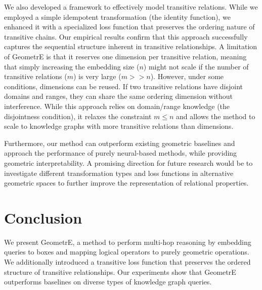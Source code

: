 \documentclass[runningheads]{llncs}
\newcommand{\method}{GeometrE}
\begin{document}
We also developed a framework to effectively model transitive
relations. While we employed a simple idempotent transformation (the
identity function), we enhanced it with a specialized loss function
that preserves the ordering nature of transitive chains. Our empirical
results confirm that this approach successfully captures the
sequential structure inherent in transitive relationships. A
limitation of GeometrE is that it reserves one dimension per
transitive relation, meaning that simply increasing the embedding size
($n$) might not scale if the number of transitive relations ($m$) is
very large ($m >> n$).  However, under some conditions, dimensions can
be reused. If two transitive relations have disjoint domains and
ranges, they can share the same ordering dimension without
interference. While this approach relies on domain/range knowledge
(the disjointness condition), it relaxes the constraint $m \le n$ and
allows the method to scale to knowledge graphs with more transitive
relations than dimensions.

Furthermore, our method can outperform existing
geometric baselines and approach the performance of purely neural-based
methods, while providing geometric interpretability. A promising
direction for future research would be to investigate different
transformation types and loss functions in alternative geometric
spaces to further improve the representation of relational properties.

\section{Conclusion}
We present \method{}, a method to perform multi-hop reasoning by
embedding queries to boxes and mapping logical operators to purely
geometric operations. We additionally introduced a transitive loss
function that preserves the ordered structure of transitive
relationships. Our experiments show that \method{} outperforms  baselines
on diverse types of knowledge graph queries.
\end{document}
